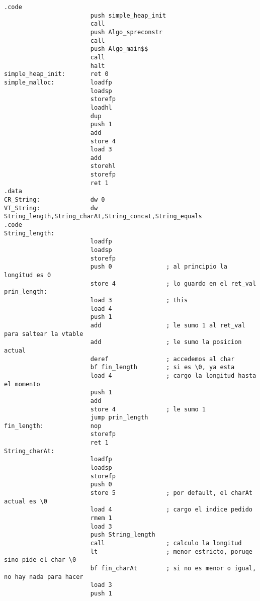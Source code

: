 \documentclass [a4paper,abstracton,titlepage]{scrartcl}
\begin{document}
\begin{lstlisting}
.code
                        push simple_heap_init
                        call
                        push Algo_spreconstr
                        call
                        push Algo_main$$
                        call
                        halt
simple_heap_init:       ret 0
simple_malloc:          loadfp
                        loadsp
                        storefp
                        loadhl
                        dup
                        push 1
                        add
                        store 4
                        load 3
                        add
                        storehl
                        storefp
                        ret 1
.data
CR_String:              dw 0
VT_String:              dw String_length,String_charAt,String_concat,String_equals
.code
String_length:         
                        loadfp
                        loadsp
                        storefp
                        push 0               ; al principio la longitud es 0
                        store 4              ; lo guardo en el ret_val
prin_length:           
                        load 3               ; this
                        load 4
                        push 1
                        add                  ; le sumo 1 al ret_val para saltear la vtable
                        add                  ; le sumo la posicion actual
                        deref                ; accedemos al char
                        bf fin_length        ; si es \0, ya esta
                        load 4               ; cargo la longitud hasta el momento
                        push 1
                        add
                        store 4              ; le sumo 1
                        jump prin_length
fin_length:             nop
                        storefp
                        ret 1
String_charAt:         
                        loadfp
                        loadsp
                        storefp
                        push 0
                        store 5              ; por default, el charAt actual es \0
                        load 4               ; cargo el indice pedido
                        rmem 1
                        load 3
                        push String_length
                        call                 ; calculo la longitud
                        lt                   ; menor estricto, poruqe sino pide el char \0
                        bf fin_charAt        ; si no es menor o igual, no hay nada para hacer
                        load 3
                        push 1

\end{lstlisting}
\end{document}
